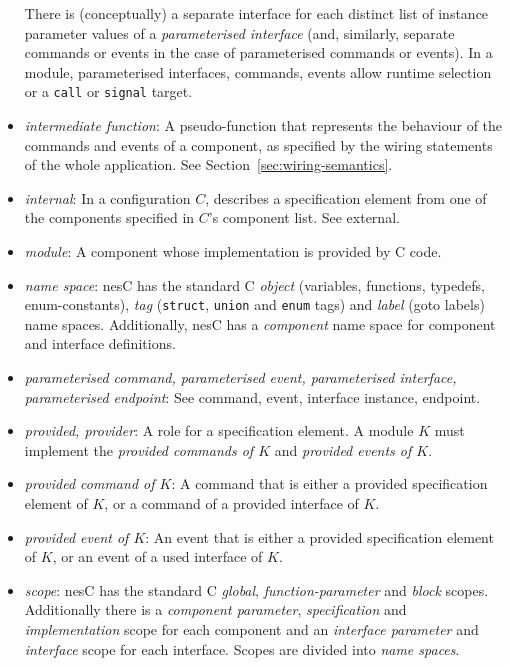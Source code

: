 \documentclass[11pt,letterpaper]{article}
\newcommand{\kw}[1]{{\tt #1}}
\newcommand{\code}[1]{{\tt #1}}
\newcommand{\nesc}{nesC\xspace}
\begin{document}
\begin{itemize}
There is (conceptually) a separate interface for each distinct list of
instance parameter values of a \emph{parameterised interface} (and,
similarly, separate commands or events in the case of parameterised
commands or events). In a module, parameterised interfaces, commands,
events allow runtime selection or a \kw{call} or \kw{signal} target.

\item \emph{intermediate function}: A pseudo-function that represents the
behaviour of the commands and events of a component, as specified by the
wiring statements of the whole application. See
Section~\ref{sec:wiring-semantics}.

\item \emph{internal}: In a configuration $C$, describes a specification
element from one of the components specified in $C$'s component list. See
external.

\item \emph{module}: A component whose implementation is provided by C
code. 

\item \emph{name space}: \nesc has the standard C \emph{object} (variables,
functions, typedefs, enum-constants), \emph{tag} (\code{struct},
\code{union} and \code{enum} tags) and \emph{label} (goto labels)
name spaces. Additionally, \nesc has a \emph{component} name space for
component and interface definitions.

\item \emph{parameterised command, parameterised event, parameterised
interface, parameterised endpoint}: See command, event, interface instance,
endpoint.

\item \emph{provided, provider}: A role for a specification
element. A module $K$ must implement the \emph{provided commands of $K$}
and \emph{provided events of $K$}.

\item \emph{provided command of $K$}: A command that is either a
provided specification element of $K$, or a command of a provided interface
of $K$.

\item \emph{provided event of $K$}: An event that is either a
provided specification element of $K$, or an event of a used interface
of $K$.

\item \emph{scope}: \nesc has the standard C \emph{global},
\emph{function-parameter} and \emph{block} scopes. Additionally there is a
\emph{component parameter}, \emph{specification} and \emph{implementation}
scope for each component and an \emph{interface parameter} and
\emph{interface} scope for each interface. Scopes are divided into
\emph{name spaces}.


\end{itemize}
\end{document}
